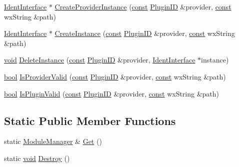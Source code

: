 \begin{DoxyCompactItemize}
\item 
\hyperlink{class_ident_interface}{Ident\+Interface} $\ast$ \hyperlink{class_module_manager_ac475594b3bcd28ab3289110337de74f8}{Create\+Provider\+Instance} (\hyperlink{getopt1_8c_a2c212835823e3c54a8ab6d95c652660e}{const} \hyperlink{include_2audacity_2_types_8h_abe9b737fcebc2b5bea606246e1eab52e}{Plugin\+ID} \&provider, \hyperlink{getopt1_8c_a2c212835823e3c54a8ab6d95c652660e}{const} wx\+String \&path)
\item 
\hyperlink{class_ident_interface}{Ident\+Interface} $\ast$ \hyperlink{class_module_manager_a8bc5eaa6ab2af671f544df4579afa2d5}{Create\+Instance} (\hyperlink{getopt1_8c_a2c212835823e3c54a8ab6d95c652660e}{const} \hyperlink{include_2audacity_2_types_8h_abe9b737fcebc2b5bea606246e1eab52e}{Plugin\+ID} \&provider, \hyperlink{getopt1_8c_a2c212835823e3c54a8ab6d95c652660e}{const} wx\+String \&path)
\item 
\hyperlink{sound_8c_ae35f5844602719cf66324f4de2a658b3}{void} \hyperlink{class_module_manager_afa00062fa05f3c7e0c0fc784f8f6c3a2}{Delete\+Instance} (\hyperlink{getopt1_8c_a2c212835823e3c54a8ab6d95c652660e}{const} \hyperlink{include_2audacity_2_types_8h_abe9b737fcebc2b5bea606246e1eab52e}{Plugin\+ID} \&provider, \hyperlink{class_ident_interface}{Ident\+Interface} $\ast$instance)
\item 
\hyperlink{mac_2config_2i386_2lib-src_2libsoxr_2soxr-config_8h_abb452686968e48b67397da5f97445f5b}{bool} \hyperlink{class_module_manager_a4870f9991dc54a1191caa0187e832ee8}{Is\+Provider\+Valid} (\hyperlink{getopt1_8c_a2c212835823e3c54a8ab6d95c652660e}{const} \hyperlink{include_2audacity_2_types_8h_abe9b737fcebc2b5bea606246e1eab52e}{Plugin\+ID} \&provider, \hyperlink{getopt1_8c_a2c212835823e3c54a8ab6d95c652660e}{const} wx\+String \&path)
\item 
\hyperlink{mac_2config_2i386_2lib-src_2libsoxr_2soxr-config_8h_abb452686968e48b67397da5f97445f5b}{bool} \hyperlink{class_module_manager_a2debe397bd3a5c9fa2b08bcd17a3b9d2}{Is\+Plugin\+Valid} (\hyperlink{getopt1_8c_a2c212835823e3c54a8ab6d95c652660e}{const} \hyperlink{include_2audacity_2_types_8h_abe9b737fcebc2b5bea606246e1eab52e}{Plugin\+ID} \&provider, \hyperlink{getopt1_8c_a2c212835823e3c54a8ab6d95c652660e}{const} wx\+String \&path)
\end{DoxyCompactItemize}
\subsection*{Static Public Member Functions}
\begin{DoxyCompactItemize}
\item 
static \hyperlink{class_module_manager}{Module\+Manager} \& \hyperlink{class_module_manager_a3820c2a8ad37e263b7fb2ed3b3aa46eb}{Get} ()
\item 
static \hyperlink{sound_8c_ae35f5844602719cf66324f4de2a658b3}{void} \hyperlink{class_module_manager_a2e8ff3a4f0e24dccb161a2887eda9451}{Destroy} ()
\end{DoxyCompactItemize}



